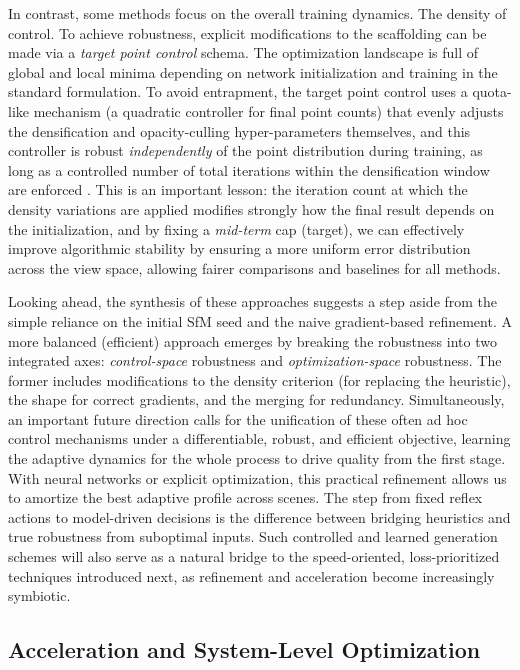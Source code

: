 \documentclass[11pt,a4paper]{article}
\begin{document}
In contrast, some methods focus on the overall training dynamics. The density of control. To achieve robustness, explicit modifications to the scaffolding can be made via a \emph{target point control} schema. The optimization landscape is full of global and local minima depending on network initialization and training in the standard formulation. To avoid entrapment, the target point control uses a quota-like mechanism (a quadratic controller for final point counts) that evenly adjusts the densification and opacity-culling hyper-parameters themselves, and this controller is robust \emph{independently} of the point distribution during training, as long as a controlled number of total iterations within the densification window are enforced \cite{arxiv:2605.16158v1}. This is an important lesson: the iteration count at which the density variations are applied modifies strongly how the final result depends on the initialization, and by fixing a \emph{mid-term} cap (target), we can effectively improve algorithmic stability by ensuring a more uniform error distribution across the view space, allowing fairer comparisons and baselines for all methods.

Looking ahead, the synthesis of these approaches suggests a step aside from the simple reliance on the initial SfM seed and the naive gradient-based refinement. A more balanced (efficient) approach emerges by breaking the robustness into two integrated axes: \emph{control-space} robustness and \emph{optimization-space} robustness. The former includes modifications to the density criterion (for replacing the heuristic), the shape for correct gradients, and the merging for redundancy. Simultaneously, an important future direction calls for the unification of these often ad hoc control mechanisms under a differentiable, robust, and efficient objective, learning the adaptive dynamics for the whole process to drive quality from the first stage. With neural networks or explicit optimization, this practical refinement allows us to amortize the best adaptive profile across scenes. The step from fixed reflex actions to model-driven decisions is the difference between bridging heuristics and true robustness from suboptimal inputs. Such controlled and learned generation schemes will also serve as a natural bridge to the speed-oriented, loss-prioritized techniques introduced next, as refinement and acceleration become increasingly symbiotic.


\subsection{Acceleration and System-Level Optimization}
\end{document}
